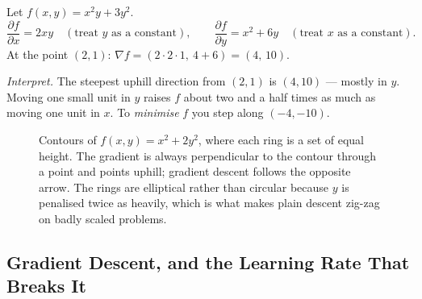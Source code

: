 \begin{workedexample}
Let $f(x,y) = x^2y + 3y^2$.
\[
  \frac{\partial f}{\partial x} = 2xy
  \quad(\text{treat }y\text{ as a constant}),
  \qquad
  \frac{\partial f}{\partial y} = x^2 + 6y
  \quad(\text{treat }x\text{ as a constant}).
\]
At the point $(2,1)$: $\nabla f = (2\cdot2\cdot1,\ 4 + 6) = (4,\,10)$.

\emph{Interpret.} The steepest uphill direction from $(2,1)$ is
$(4,10)$ --- mostly in $y$. Moving one small unit in $y$ raises $f$ about two
and a half times as much as moving one unit in $x$. To \emph{minimise} $f$ you
step along $(-4,-10)$.
\end{workedexample}

\begin{figure}[htbp]
\centering
{}
\caption{Contours of $f(x,y)=x^2+2y^2$, where each ring is a set of equal
height. The gradient is always perpendicular to the contour through a point and
points uphill; gradient descent follows the opposite arrow. The rings are
elliptical rather than circular because $y$ is penalised twice as heavily,
which is what makes plain descent zig-zag on badly scaled problems.}
\label{fig:math-gradient-contours}
\end{figure}

\subsection{Gradient Descent, and the Learning Rate That Breaks It}

